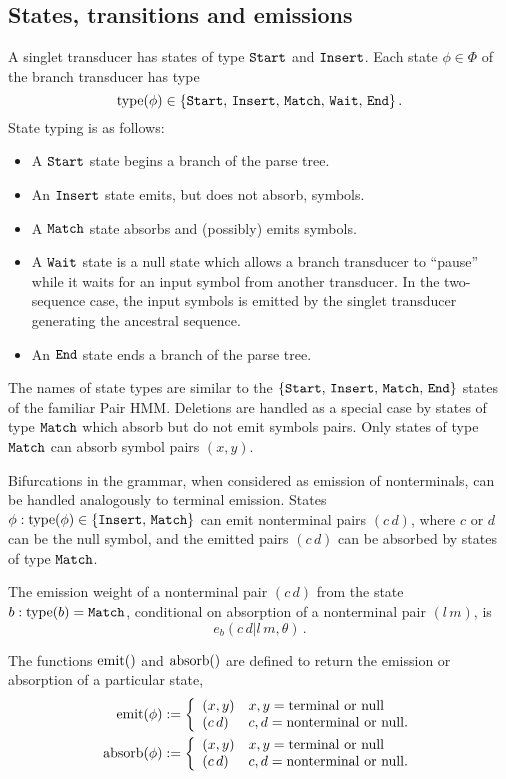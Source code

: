 \documentclass[10pt]{article}
\begin{document}
\subsection{States, transitions and emissions}
A singlet transducer has states of type $\mathtt{Start}$ and $\mathtt{Insert}$.
Each state $\phi\in\Phi$ of the branch transducer has type
\[ \operatorname{type}(\phi) \in \lbrace\mathtt{Start},\,\mathtt{Insert},\,\mathtt{Match},\,\mathtt{Wait},\,\mathtt{End}\rbrace \, . \]
State typing is as follows:
\begin{itemize}
  \item A $\mathtt{Start}$ state begins a branch of the parse tree.
  \item An $\mathtt{Insert}$ state emits, but does not absorb, symbols.
  \item A $\mathtt{Match}$ state absorbs and (possibly) emits symbols.
  \item A $\mathtt{Wait}$ state is a null state which allows a branch transducer to ``pause''
    while it waits for an input symbol from another transducer.
    In the two-sequence case, the input symbols is emitted by the singlet transducer generating
    the ancestral sequence.
  \item An $\mathtt{End}$ state ends a branch of the parse tree.
\end{itemize}
The names of state types are similar to the $\{\mathtt{Start},\,\mathtt{Insert},\,\mathtt{Match},\,\mathtt{End}\}$ states of the familiar Pair HMM.
Deletions are handled as a special case by states of type $\mathtt{Match}$ which absorb but do not emit symbols pairs.
Only states of type $\mathtt{Match}$ can absorb symbol pairs $(x,y)$.

Bifurcations in the grammar, when considered as emission of nonterminals, can be handled analogously
to terminal emission.  States $\phi: \operatorname{type}(\phi) \in \{\mathtt{Insert},\,\mathtt{Match}\}$ can emit nonterminal pairs $(c\,d)$,
where $c$ or $d$ can be the null symbol, and the emitted pairs $(c\,d)$ can be absorbed by states of type $\mathtt{Match}$.

The emission weight of a nonterminal pair $(c\,d)$ from the state $b: \operatorname{type}(b) = \mathtt{Match}$, 
conditional on absorption of a nonterminal pair $(l\,m)$, is 
\[ e_b ( c\,d|l\,m,\theta ) \, . \]

The functions $\operatorname{emit}()$ and $\operatorname{absorb}()$ are defined to return the emission or absorption of a particular state,
\begin{align*}
  \operatorname{emit}(\phi) &:= \left\{\begin{array}{ll} (x,y) & x,y = \mathrm{terminal\,\,or\,\,null} \\(c\,d) & c,d = \mathrm{nonterminal\,\,or\,\,null}. \end{array} \right. \\
  \operatorname{absorb}(\phi) &:= \left\{\begin{array}{ll} (x,y) & x,y = \mathrm{terminal\,\,or\,\,null} \\(c\,d) & c,d = \mathrm{nonterminal\,\,or\,\,null}. \end{array} \right.
\end{align*}
\end{document}
